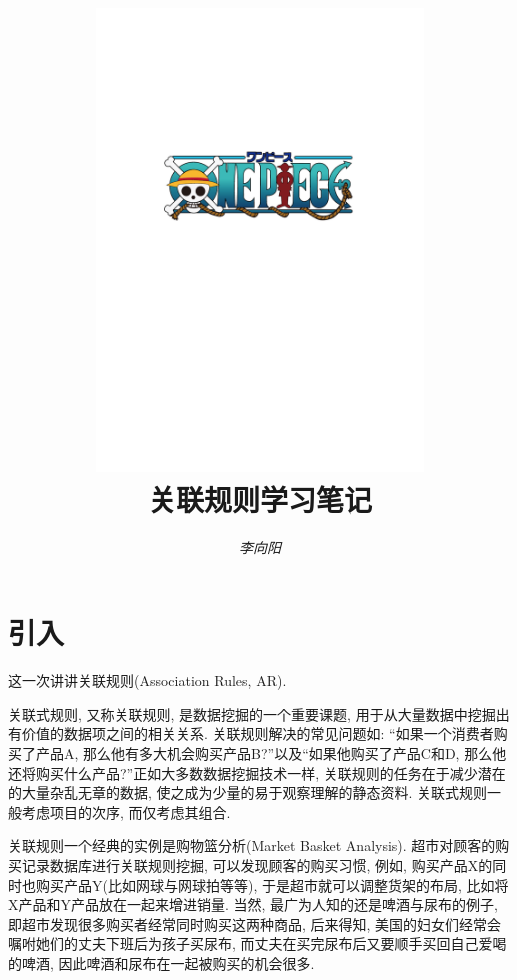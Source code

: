 \documentclass[a4paper,UTF8]{ctexart}
\theoremstyle{plain} \newtheorem{theorem}{定理}[section]
\theoremstyle{plain} \newtheorem{definition}{定义}[section]
\theoremstyle{plain} \newtheorem{lemma}{引理}[section]
\theoremstyle{plain} \newtheorem{proposition}{命题}[section]
\theoremstyle{plain} \newtheorem{example}{例}[section]
\theoremstyle{plain} \newtheorem{remark}{注}[section]
\theoremstyle{plain} \newtheorem{corollary}{推论}[section]
\begin{document}
\title{
\includegraphics[width=0.65\textwidth]{onepiece.pdf}\\
\vspace{2em}
\textbf{关联规则学习笔记}}
\author{\emph{李向阳} 
}
\date{}


\maketitle
\thispagestyle{empty}

\newpage


\tableofcontents

\newpage

\section{引入}
这一次讲讲关联规则(Association Rules, AR).

关联式规则, 又称关联规则, 是数据挖掘的一个重要课题, 用于从大量数据中挖掘出有价值的数据项之间的相关关系. 关联规则解决的常见问题如: “如果一个消费者购买了产品A, 那么他有多大机会购买产品B?”以及“如果他购买了产品C和D, 那么他还将购买什么产品?”正如大多数数据挖掘技术一样, 关联规则的任务在于减少潜在的大量杂乱无章的数据, 使之成为少量的易于观察理解的静态资料. 关联式规则一般考虑项目的次序, 而仅考虑其组合.

关联规则一个经典的实例是购物篮分析(Market Basket Analysis). 超市对顾客的购买记录数据库进行关联规则挖掘, 可以发现顾客的购买习惯, 例如, 购买产品X的同时也购买产品Y(比如网球与网球拍等等), 于是超市就可以调整货架的布局, 比如将X产品和Y产品放在一起来增进销量. 当然, 最广为人知的还是啤酒与尿布的例子, 即超市发现很多购买者经常同时购买这两种商品, 后来得知, 美国的妇女们经常会嘱咐她们的丈夫下班后为孩子买尿布, 而丈夫在买完尿布后又要顺手买回自己爱喝的啤酒, 因此啤酒和尿布在一起被购买的机会很多.
\end{document}
